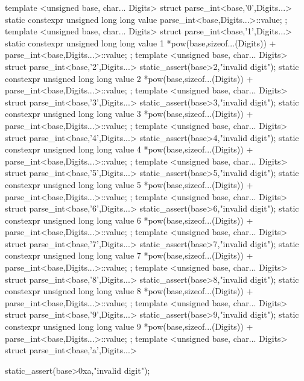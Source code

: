 \documentclass[ebook,11pt,article]{memoir}
\begin{document}
\begin{codeblock}
{{template <unsigned base, char... Digits>
struct parse_int<base,'0',Digits...>{
    static constexpr unsigned long long value{ parse_int<base,Digits...>::value};
};
template <unsigned base, char... Digits>
struct parse_int<base,'1',Digits...>{
    static constexpr unsigned long long value{ 1 *pow(base,sizeof...(Digits))
                                               + parse_int<base,Digits...>::value};
};
template <unsigned base, char... Digits>
struct parse_int<base,'2',Digits...>{
    static_assert(base>2,"invalid digit");
    static constexpr unsigned long long value{ 2 *pow(base,sizeof...(Digits))
                                               + parse_int<base,Digits...>::value};
};
template <unsigned base, char... Digits>
struct parse_int<base,'3',Digits...>{
    static_assert(base>3,"invalid digit");
    static constexpr unsigned long long value{ 3 *pow(base,sizeof...(Digits))
                                               + parse_int<base,Digits...>::value};
};
template <unsigned base, char... Digits>
struct parse_int<base,'4',Digits...>{
    static_assert(base>4,"invalid digit");
    static constexpr unsigned long long value{ 4 *pow(base,sizeof...(Digits))
                                               + parse_int<base,Digits...>::value};
};
template <unsigned base, char... Digits>
struct parse_int<base,'5',Digits...>{
    static_assert(base>5,"invalid digit");
    static constexpr unsigned long long value{ 5 *pow(base,sizeof...(Digits))
                                               + parse_int<base,Digits...>::value};
};
template <unsigned base, char... Digits>
struct parse_int<base,'6',Digits...>{
    static_assert(base>6,"invalid digit");
    static constexpr unsigned long long value{ 6 *pow(base,sizeof...(Digits))
                                               + parse_int<base,Digits...>::value};
};
template <unsigned base, char... Digits>
struct parse_int<base,'7',Digits...>{
    static_assert(base>7,"invalid digit");
    static constexpr unsigned long long value{ 7 *pow(base,sizeof...(Digits))
                                               + parse_int<base,Digits...>::value};
};
template <unsigned base, char... Digits>
struct parse_int<base,'8',Digits...>{
    static_assert(base>8,"invalid digit");
    static constexpr unsigned long long value{ 8 *pow(base,sizeof...(Digits))
                                               + parse_int<base,Digits...>::value};
};
template <unsigned base, char... Digits>
struct parse_int<base,'9',Digits...>{
    static_assert(base>9,"invalid digit");
    static constexpr unsigned long long value{ 9 *pow(base,sizeof...(Digits))
                                               + parse_int<base,Digits...>::value};
};
template <unsigned base, char... Digits>
struct parse_int<base,'a',Digits...>{
    static_assert(base>0xa,"invalid digit");

}}}
\end{codeblock}
\end{document}
